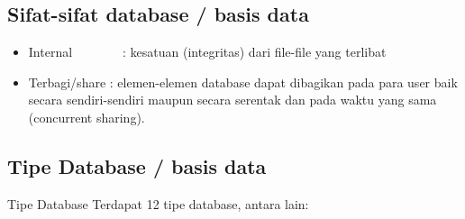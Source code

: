 \subsection{Sifat-sifat database / basis data}
\noindent 
\begin{itemize}
\item Internal~~~~~~~~:  kesatuan (integritas) dari file-file yang terlibat
\noindent 
\item Terbagi/share : elemen-elemen database dapat dibagikan pada para user baik secara sendiri-sendiri maupun secara serentak dan pada waktu yang sama (concurrent sharing).\end{itemize}
\vspace{12pt}
\noindent 
\subsection{Tipe Database / basis data} 
\noindent 
Tipe Database Terdapat 12 tipe database, antara lain: 
\noindent 
